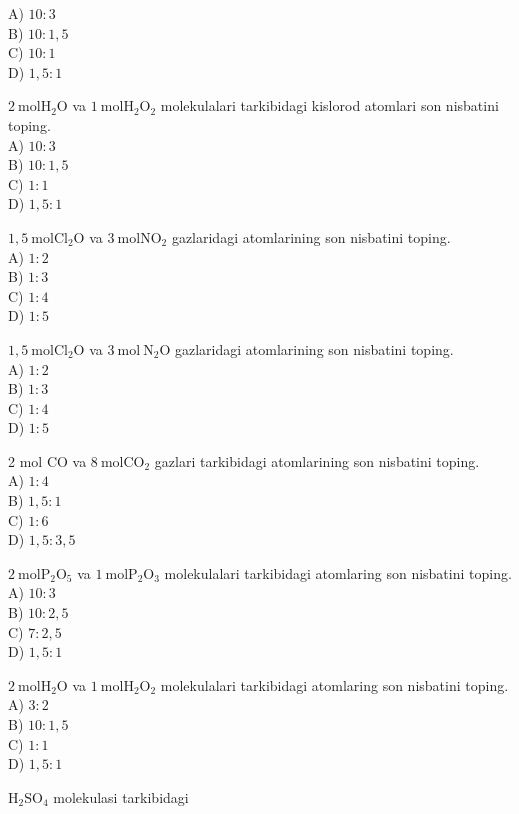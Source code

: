 A) $10: 3$\\
B) $10: 1,5$\\
C) $10: 1$\\
D) $1,5: 1$
  \item $2 \mathrm{~mol} \mathrm{H}_{2} \mathrm{O}$ va $1 \mathrm{~mol} \mathrm{H}_{2} \mathrm{O}_{2}$ molekulalari tarkibidagi kislorod atomlari son nisbatini toping.\\
A) $10: 3$\\
B) $10: 1,5$\\
C) $1: 1$\\
D) $1,5: 1$
  \item $1,5 \mathrm{~mol} \mathrm{Cl}_{2} \mathrm{O}$ va $3 \mathrm{~mol} \mathrm{NO}_{2}$ gazlaridagi atomlarining son nisbatini toping.\\
A) $1: 2$\\
B) $1: 3$\\
C) $1: 4$\\
D) $1: 5$
  \item $1,5 \mathrm{~mol} \mathrm{Cl}_{2} \mathrm{O}$ va $3 \mathrm{~mol} \mathrm{~N}_{2} \mathrm{O}$ gazlaridagi atomlarining son nisbatini toping.\\
A) $1: 2$\\
B) $1: 3$\\
C) $1: 4$\\
D) $1: 5$
  \item 2 mol CO va $8 \mathrm{~mol} \mathrm{CO}_{2}$ gazlari tarkibidagi atomlarining son nisbatini toping.\\
A) $1: 4$\\
B) $1,5: 1$\\
C) $1: 6$\\
D) $1,5: 3,5$
  \item $2 \mathrm{~mol} \mathrm{P}_{2} \mathrm{O}_{5}$ va $1 \mathrm{~mol} \mathrm{P}_{2} \mathrm{O}_{3}$ molekulalari tarkibidagi atomlaring son nisbatini toping.\\
A) $10: 3$\\
B) $10: 2,5$\\
C) $7: 2,5$\\
D) $1,5: 1$
  \item $2 \mathrm{~mol} \mathrm{H}_{2} \mathrm{O}$ va $1 \mathrm{~mol} \mathrm{H}_{2} \mathrm{O}_{2}$ molekulalari tarkibidagi atomlaring son nisbatini toping.\\
A) $3: 2$\\
B) $10: 1,5$\\
C) $1: 1$\\
D) $1,5: 1$
  \item $\mathrm{H}_{2} \mathrm{SO}_{4}$ molekulasi tarkibidagi\\
